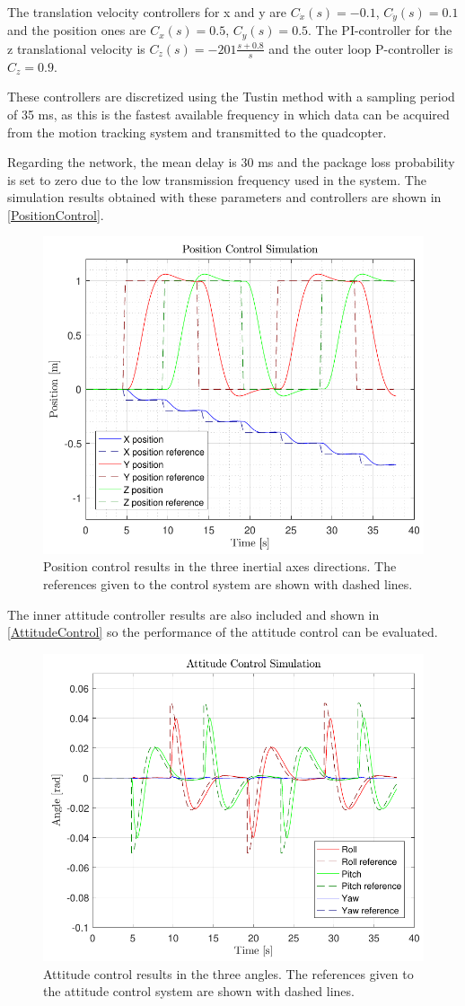 The translation velocity controllers for x and y are $C_{\dot{x}}(s)= -0.1$, $C_{\dot{y}}(s)= 0.1$ and the position ones are $C_x(s)= 0.5$, $C_y(s)= 0.5$. The PI-controller for the z translational velocity is $C_{\dot{z}}(s)=-201\frac{s+0.8}{s}$ and the outer loop P-controller is $C_z=0.9$.

These controllers are discretized using the Tustin method with a sampling period of 35 ms, as this is the fastest available frequency in which data can be acquired from the motion tracking system and transmitted to the quadcopter.

Regarding the network, the mean delay is 30 ms and the package loss probability is set to zero due to the low transmission frequency used in the system.
The simulation results obtained with these parameters and controllers are shown in \autoref{PositionControl}.
\begin{figure}[H]
	\centering
	\includegraphics[width=.4\textwidth]{figures/PositionControl}
	\caption{Position control results in the three inertial axes directions. The references given to the control system are shown with dashed lines.}
	\label{PositionControl}
\end{figure}

The inner attitude controller results are also included and shown in \autoref{AttitudeControl} so the performance of the attitude control can be evaluated. 
\begin{figure}[H]
	\centering
	\includegraphics[width=.4\textwidth]{figures/AttitudeControl}
	\caption{Attitude control results in the three angles. The references given to the attitude control system are shown with dashed lines.}
	\label{AttitudeControl}
\end{figure}


